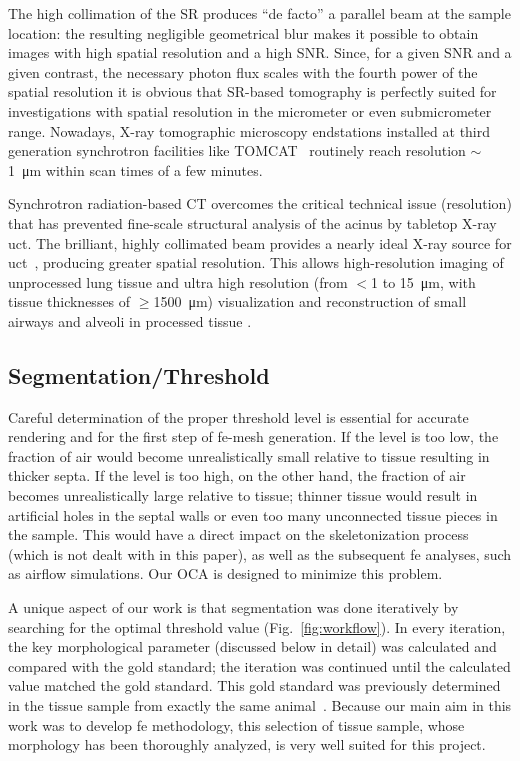 The high collimation of the \ac{SR} produces ``de facto'' a parallel beam at the sample location: the resulting negligible geometrical blur makes it possible to obtain images with high spatial resolution and a high \ac{SNR}. Since, for a given \ac{SNR} and a given contrast, the necessary photon flux scales with the fourth power of the spatial resolution \cite{Bonse1996} it is obvious that \ac{SR}-based tomography is perfectly suited for investigations with spatial resolution in the micrometer or even submicrometer range. Nowadays, X-ray tomographic microscopy endstations installed at third generation synchrotron facilities like \ac{TOMCAT}~\cite{Stampanoni2007} routinely reach resolution $\sim$\SI{1}{\micro\meter} within scan times of a few minutes.

Synchrotron radiation-based \ac{CT} overcomes the critical technical issue (resolution) that has prevented fine-scale structural analysis of the acinus by tabletop X-ray \ac{uct}. The brilliant, highly collimated beam provides a nearly ideal X-ray source for \ac{uct}~\cite{Jorgensen1998}, producing greater spatial resolution. This allows high-resolution imaging of unprocessed lung tissue \cite{Bayat2006,Jheon2006,Monfraix2005,Sera2007,Sera2005} and ultra high resolution (from $<$1 to \SI{15}{\micro\meter}, with tissue thicknesses of $\geq$\SI{1500}{\micro\meter}) visualization and \threed reconstruction of small airways and alveoli in processed tissue \cite{Ikura2004,Schittny2008}.

\subsection{Segmentation/Threshold}
Careful determination of the proper threshold level is essential for accurate \threed rendering and for the first step of \ac{fe}-mesh generation. If the level is too low, the fraction of air would become unrealistically small relative to tissue resulting in thicker septa. If the level is too high, on the other hand, the fraction of air becomes unrealistically large relative to tissue; thinner tissue would result in artificial holes in the septal walls or even too many unconnected tissue pieces in the sample. This would have a direct impact on the skeletonization process (which is not dealt with in this paper), as well as the subsequent \ac{fe} analyses, such as airflow simulations. Our \ac{OCA} is designed to minimize this problem.

A unique aspect of our work is that segmentation was done iteratively by searching for the optimal threshold value (Fig.~\ref{fig:workflow}). In every iteration, the key morphological parameter (discussed below in detail) was calculated and compared with the gold standard; the iteration was continued until the calculated value matched the gold standard. This gold standard was previously determined in the tissue sample from exactly the same animal~\cite{Tschanz2003}. Because our main aim in this work was to develop \ac{fe} methodology, this selection of tissue sample, whose morphology has been thoroughly analyzed, is very well suited for this project.


